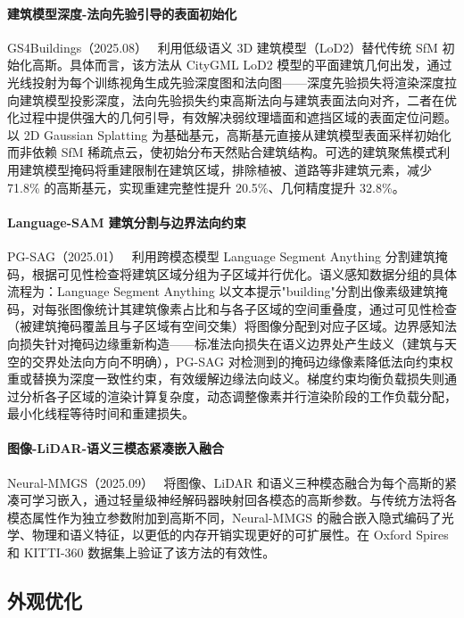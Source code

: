\paragraph{建筑模型深度-法向先验引导的表面初始化}

GS4Buildings（2025.08）~\cite{2508_07355} 利用低级语义 3D 建筑模型（LoD2）替代传统 SfM 初始化高斯。具体而言，该方法从 CityGML LoD2 模型的平面建筑几何出发，通过光线投射为每个训练视角生成先验深度图和法向图——深度先验损失将渲染深度拉向建筑模型投影深度，法向先验损失约束高斯法向与建筑表面法向对齐，二者在优化过程中提供强大的几何引导，有效解决弱纹理墙面和遮挡区域的表面定位问题。以 2D Gaussian Splatting 为基础基元，高斯基元直接从建筑模型表面采样初始化而非依赖 SfM 稀疏点云，使初始分布天然贴合建筑结构。可选的建筑聚焦模式利用建筑模型掩码将重建限制在建筑区域，排除植被、道路等非建筑元素，减少 71.8\% 的高斯基元，实现重建完整性提升 20.5\%、几何精度提升 32.8\%。

\paragraph{Language-SAM 建筑分割与边界法向约束}

PG-SAG（2025.01）~\cite{2501_01677} 利用跨模态模型 Language Segment Anything 分割建筑掩码，根据可见性检查将建筑区域分组为子区域并行优化。语义感知数据分组的具体流程为：Language Segment Anything 以文本提示"building"分割出像素级建筑掩码，对每张图像统计其建筑像素占比和与各子区域的空间重叠度，通过可见性检查（被建筑掩码覆盖且与子区域有空间交集）将图像分配到对应子区域。边界感知法向损失针对掩码边缘重新构造——标准法向损失在语义边界处产生歧义（建筑与天空的交界处法向方向不明确），PG-SAG 对检测到的掩码边缘像素降低法向约束权重或替换为深度一致性约束，有效缓解边缘法向歧义。梯度约束均衡负载损失则通过分析各子区域的渲染计算复杂度，动态调整像素并行渲染阶段的工作负载分配，最小化线程等待时间和重建损失。

\paragraph{图像-LiDAR-语义三模态紧凑嵌入融合}

Neural-MMGS（2025.09）~\cite{2509_17762} 将图像、LiDAR 和语义三种模态融合为每个高斯的紧凑可学习嵌入，通过轻量级神经解码器映射回各模态的高斯参数。与传统方法将各模态属性作为独立参数附加到高斯不同，Neural-MMGS 的融合嵌入隐式编码了光学、物理和语义特征，以更低的内存开销实现更好的可扩展性。在 Oxford Spires 和 KITTI-360 数据集上验证了该方法的有效性。

\subsection{外观优化}
\label{ss:14_3}

